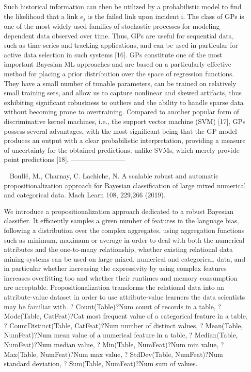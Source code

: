 Such historical information can then be utilized by a probabilistic model to find the likelihood that a link $e_j$ is the failed link upon incident i. The class of GPs is one of the most widely used families of stochastic processes for modeling dependent data observed over time. Thus, GPs are useful for sequential data, such as time-series and tracking applications, and can be used in particular for active data selection in such systems [16]. GPs constitute one of the most important Bayesian ML approaches and are based on a particularly effective method for placing a prior distribution over the space of regression functions. They have a small number of tunable parameters, can be trained on relatively small training sets, and allow us to capture nonlinear and skewed artifacts, thus exhibiting significant robustness to outliers and the ability to handle sparse data without becoming prone to overtraining. Compared to another popular form of discriminative kernel machines, i.e., the support vector machine (SVM) [17], GPs possess several advantages, with the most significant being that the GP model produces an output with a clear probabilistic interpretation, providing a measure of uncertainty for the obtained predictions, unlike SVMs, which merely provide point predictions [18].
------------------------

~\cite{Boulle:2019aa}
Boullé, M., Charnay, C.  Lachiche, N. A scalable robust and automatic propositionalization approach for Bayesian classification of large mixed numerical and categorical data. Mach Learn 108, 229,266 (2019).

We introduce a propositionalization approach dedicated to a robust Bayesian classifier. It efficiently samples a given number of features in the language bias, following a distribution over the complex aggregates.  
using aggregation functions such as minimum, maximum or average in order to deal with both the numerical attributes and the one-to-many relationship, whether existing relational data mining systems can be used on large mixed, numerical and categorical, data, and in particular whether increasing the expressivity by using complex features increases overfitting too and whether their runtimes and memory consumption are acceptable.
Propositionalization transforms the relational data into an attribute-value dataset in order to use attribute-value learners the data scientists may be familiar with. 
? Count(Table)?Num count of records in a table,
? Mode(Table, CatFeat)?Cat most frequent value of a categorical feature in a table,
? CountDistinct(Table, CatFeat)?Num number of distinct values,
? Mean(Table, NumFeat)?Num mean value of a numerical feature in a table, ? Median(Table, NumFeat)?Num median value,
? Min(Table, NumFeat)?Num min value,
? Max(Table, NumFeat)?Num max value,
? StdDev(Table, NumFeat)?Num standard deviation, ? Sum(Table, NumFeat)?Num sum of values.

